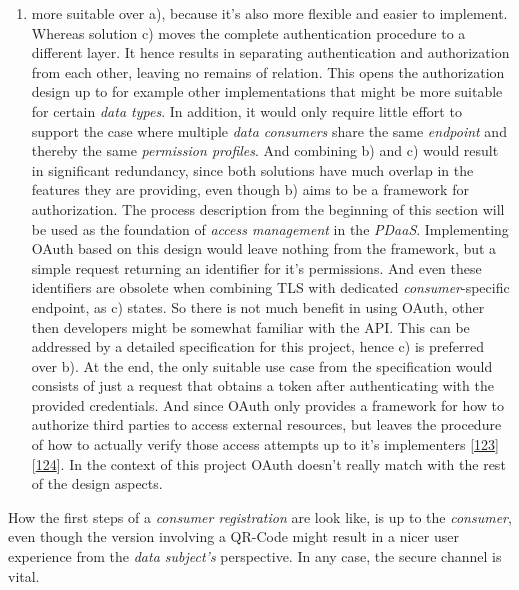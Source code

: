 \documentclass[12pt,english,a4paper,titlepage,cleardoublepage=empty,dottedtoc]{report}
\providecommand{\tightlist}{%
  \setlength{\itemsep}{0pt}\setlength{\parskip}{0pt}}
\begin{document}
\begin{enumerate}
\def\labelenumi{\alph{enumi})}
\setcounter{enumi}{1}
\tightlist
\item
  more suitable over a), because it's also more flexible and easier to
  implement. Whereas solution c) moves the complete authentication
  procedure to a different layer. It hence results in separating
  authentication and authorization from each other, leaving no remains
  of relation. This opens the authorization design up to for example
  other implementations that might be more suitable for certain
  \emph{data types}. In addition, it would only require little effort to
  support the case where multiple \emph{data consumers} share the same
  \emph{endpoint} and thereby the same \emph{permission profiles}. And
  combining b) and c) would result in significant redundancy, since both
  solutions have much overlap in the features they are providing, even
  though b) aims to be a framework for authorization. The process
  description from the beginning of this section will be used as the
  foundation of \emph{access management} in the \emph{PDaaS}.
  Implementing OAuth based on this design would leave nothing from the
  framework, but a simple request returning an identifier for it's
  permissions. And even these identifiers are obsolete when combining
  TLS with dedicated \emph{consumer}-specific endpoint, as c) states. So
  there is not much benefit in using OAuth, other then developers might
  be somewhat familiar with the API. This can be addressed by a detailed
  specification for this project, hence c) is preferred over b). At the
  end, the only suitable use case from the specification would consists
  of just a request that obtains a token after authenticating with the
  provided credentials. And since OAuth only provides a framework for
  how to authorize third parties to access external resources, but
  leaves the procedure of how to actually verify those access attempts
  up to it's implementers
  {[}\protect\hyperlink{ref-web_spec_oauth-1a_access-verification}{123}{]}
  {[}\protect\hyperlink{ref-web_spec_oauth-2_access-verification}{124}{]}.
  In the context of this project OAuth doesn't really match with the
  rest of the design aspects.
\end{enumerate}

How the first steps of a \emph{consumer registration} are look like, is
up to the \emph{consumer}, even though the version involving a QR-Code
might result in a nicer user experience from the \emph{data subject's}
perspective. In any case, the secure channel is vital.
\end{document}
